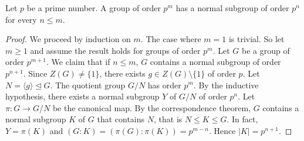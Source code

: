 \begin{theorem}
    Let $p$ be a prime number. 
    A group of order $p^m$ has a normal subgroup of order
    $p^n$ for every $n\leq m$.
\end{theorem}

\begin{proof}
    We proceed by induction on $m$. The case where $m=1$ is trivial. So let $m\geq1$ and 
    assume the result holds for groups of order $p^m$. Let
    $G$ be a group of order $p^{m+1}$.
    We claim that if $n\leq m$, $G$ contains a normal subgroup of
    order $p^{n+1}$. Since $Z(G)\ne\{1\}$, there exists
    $g\in Z(G)\setminus\{1\}$ of order $p$. Let
$N=\langle g\rangle\unlhd G$. The quotient 
group $G/N$ has order $p^m$. By the inductive hypothesis, 
there exists a normal subgroup $Y$ of $G/N$ of order $p^n$. Let 
$\pi\colon G\to G/N$ be the canonical map. 
By the correspondence theorem, $G$ contains a normal subgroup $K$ of $G$ 
that contains $N$, that is $N\leq K\leq G$. In fact, 
$Y=\pi(K)$ and 
$(G:K)=(\pi(G):\pi(K))=p^{m-n}$. Hence $|K|=p^{n+1}$.
\end{proof}


